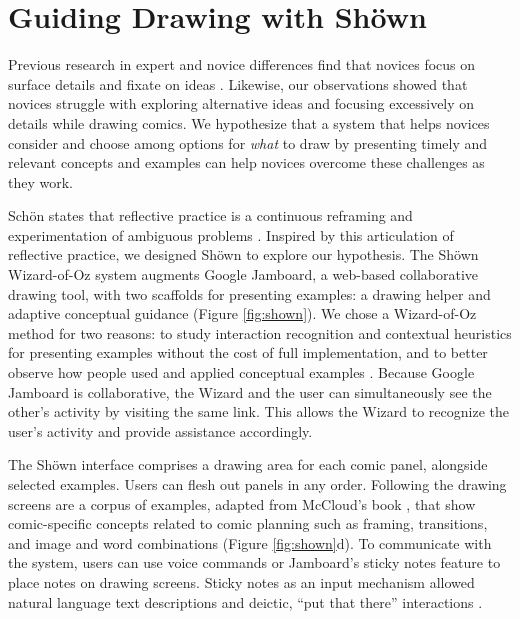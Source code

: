 \section{Guiding Drawing with Sh\"{o}wn}

Previous research in expert and novice differences find that novices focus on surface details and fixate on ideas \cite{Chase1973,chi1981categorization,jansson1991design,yuan2016}. Likewise, our observations showed that novices struggle with exploring alternative ideas and focusing excessively on details while drawing comics. We hypothesize that a system that helps novices consider and choose among options for \emph{what} to draw by presenting timely and relevant concepts and examples can help novices overcome these challenges as they work. 

Sch{\"o}n states that reflective practice is a continuous reframing and experimentation of ambiguous problems \cite{schon1984reflective}. Inspired by this articulation of reflective practice, we designed Sh{\"o}wn to explore our hypothesis. The Sh{\"o}wn Wizard-of-Oz system augments Google Jamboard, a web-based collaborative drawing tool, with two scaffolds for presenting examples: a drawing helper and adaptive conceptual guidance (Figure \ref{fig:shown}). We chose a Wizard-of-Oz method for two reasons: to study interaction recognition and contextual heuristics for presenting examples without the cost of full implementation, and to better observe how people used and applied conceptual examples \cite{walny2012understanding}. Because Google Jamboard is collaborative, the Wizard and the user can simultaneously see the other's activity by visiting the same link. This allows the Wizard to recognize the user's activity and provide assistance accordingly.

The Sh{\"o}wn interface comprises a drawing area for each comic panel, alongside selected examples. Users can flesh out panels in any order.
Following the drawing screens are a corpus of examples, adapted from McCloud's book \cite{mccloud2006making}, that show comic-specific concepts related to comic planning such as framing, transitions, and image and word combinations (Figure \ref{fig:shown}d). 
To communicate with the system, users can use voice commands or Jamboard's sticky notes feature to place notes on drawing screens. Sticky notes as an input mechanism allowed natural language text descriptions and deictic, ``put that there'' interactions \cite{engelbart1968research}.

